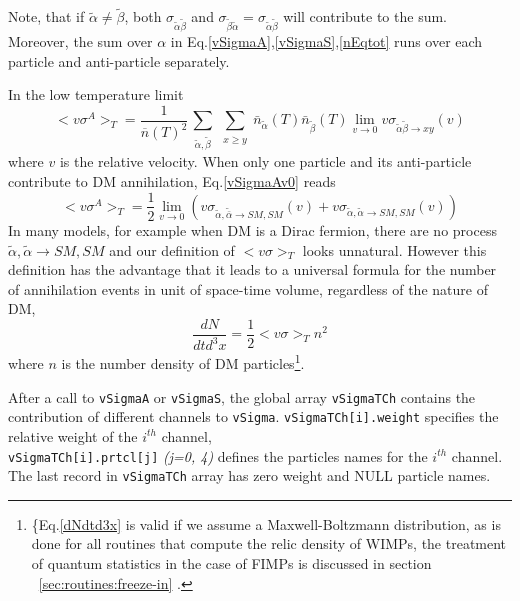 \documentclass[12pt,a4paper]{article}
\begin{document}
 Note, that if $\tilde\alpha \ne \tilde\beta$, both 
${\sigma}_{\tilde\alpha\tilde\beta}$ and  ${\sigma}_{\tilde\beta\tilde\alpha}={\sigma}_{\tilde\alpha\tilde\beta}$ will contribute to the sum. Moreover, 
 the sum over $\alpha$ in Eq.\ref{vSigmaA},\ref{vSigmaS},\ref{nEqtot} 
 runs over  each  particle and anti-particle separately. 

  In the low temperature limit 
\begin{equation}
\label{vSigmaAv0}
<v\sigma^A>_T = \frac{1}{\overline{n}(T)^2}   
\sum_{\substack{
\tilde\alpha ,\tilde\beta }}  
\sum_{\substack{ x \ge y }} \bar{n}_{\tilde{\alpha}}(T) \bar{n}_{\tilde{\beta}}(T)  { \lim_{v \to 0}}  v\sigma_{\tilde\alpha\tilde\beta\to x y}(v)    
\end{equation} 
where $v$ is the relative velocity.  When only one  particle and its anti-particle  contribute to DM annihilation, Eq.\ref{vSigmaAv0} reads 
\begin{equation}
<v\sigma^A>_T =\frac{1}{2} \lim_{v\to 0} ( v \sigma_{\tilde{\alpha},\tilde{\bar{\alpha}} \to SM,SM }(v) + v \sigma_{\tilde{\alpha},\tilde{\alpha} \to SM,SM }(v)) 
\end{equation} 
In many models, for example when DM is a Dirac fermion,   there are no process $ \tilde{\alpha},\tilde{\alpha} \to SM,SM $ and our definition of $<v\sigma>_T $ looks   
unnatural. However this definition has the advantage that it  leads to a universal formula for the number of annihilation events in unit of space-time volume, regardless of the nature of DM, 
\begin{equation}
\label{dNdtd3x}  
  \frac{dN}{dt d^3x}= \frac{1}{2} <v\sigma>_T n^2 
\end{equation}
where $n$ is the number density of DM particles\footnote{\{Eq.\ref{dNdtd3x} is valid if we assume a Maxwell-Boltzmann distribution, as is done  for all routines that compute the relic density of WIMPs, the treatment of   quantum statistics in the case of FIMPs is discussed in section ~\ref{sec:routines:freeze-in} .}.



After a call to {\tt vSigmaA} or {\tt vSigmaS}, the global array {\tt vSigmaTCh} contains the 
contribution of different channels to {\tt vSigma}. \verb|vSigmaTCh[i].weight| specifies the relative
weight of the $i^{th}$ channel, \\
\verb|vSigmaTCh[i].prtcl[j]|  {\it (j=0, 4)}  defines the particles names for the $i^{th}$
channel.\\
The last record in \verb|vSigmaTCh| array has zero weight and 
NULL particle names.\\
\end{document}
